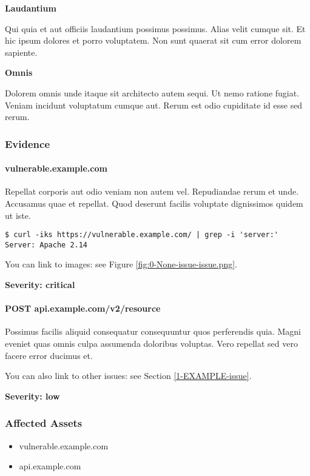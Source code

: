 \documentclass[a4paper]{article}
\def\tightlist{}
\begin{document}
\textbf{Laudantium}

Qui quia et aut officiis laudantium possimus possimus.
Alias velit cumque sit.
Et hic ipsum dolores et porro voluptatem.
Non sunt quaerat sit cum error dolorem sapiente.

\textbf{Omnis}

Dolorem omnis unde itaque sit architecto autem sequi.
Ut nemo ratione fugiat.
Veniam incidunt voluptatum cumque aut.
Rerum est odio cupiditate id esse sed rerum.


    \subsubsection{Evidence}

          \paragraph{vulnerable.example.com}

      Repellat corporis aut odio veniam non autem vel.
Repudiandae rerum et unde. Accusamus quae et repellat.
Quod deserunt facilis voluptate dignissimos quidem ut iste.

\begin{lstlisting}
$ curl -iks https://vulnerable.example.com/ | grep -i 'server:'
Server: Apache 2.14
\end{lstlisting}

You can link to images: see Figure \ref{fig:0-None-issue-issue.png}.

\textbf{Severity: critical}

          \paragraph{POST api.example.com/v2/resource}

      Possimus facilis aliquid consequatur consequuntur quos perferendis quia.
Magni eveniet quas omnis culpa assumenda doloribus voluptas.
Vero repellat sed vero facere error ducimus et.

You can also link to other issues: see Section \ref{1-EXAMPLE-issue}.

\textbf{Severity: low}

    
    \subsubsection{Affected Assets}

    \begin{itemize}
\tightlist
\item
  vulnerable.example.com
\item
  api.example.com
\end{itemize}
\end{document}
